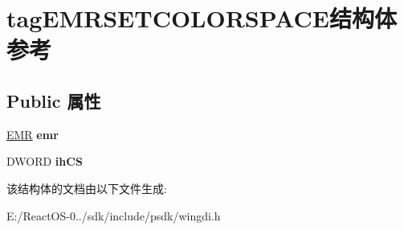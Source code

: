 \hypertarget{structtag_e_m_r_s_e_t_c_o_l_o_r_s_p_a_c_e}{}\section{tag\+E\+M\+R\+S\+E\+T\+C\+O\+L\+O\+R\+S\+P\+A\+C\+E结构体 参考}
\label{structtag_e_m_r_s_e_t_c_o_l_o_r_s_p_a_c_e}
\subsection*{Public 属性}
\begin{DoxyCompactItemize}
\item 
\mbox{\label{structtag_e_m_r_s_e_t_c_o_l_o_r_s_p_a_c_e_ab60e48e1ad1aad4667d34fa12e65f937}} 
\hyperlink{structtag_e_m_r}{E\+MR} {\bfseries emr}
\item 
\mbox{\label{structtag_e_m_r_s_e_t_c_o_l_o_r_s_p_a_c_e_a8132dbc29abb1bb764bbff9c54b55e86}} 
D\+W\+O\+RD {\bfseries ih\+CS}
\end{DoxyCompactItemize}


该结构体的文档由以下文件生成\+:\begin{DoxyCompactItemize}
\item 
E\+:/\+React\+O\+S-\/0../sdk/include/psdk/wingdi.\+h\end{DoxyCompactItemize}
